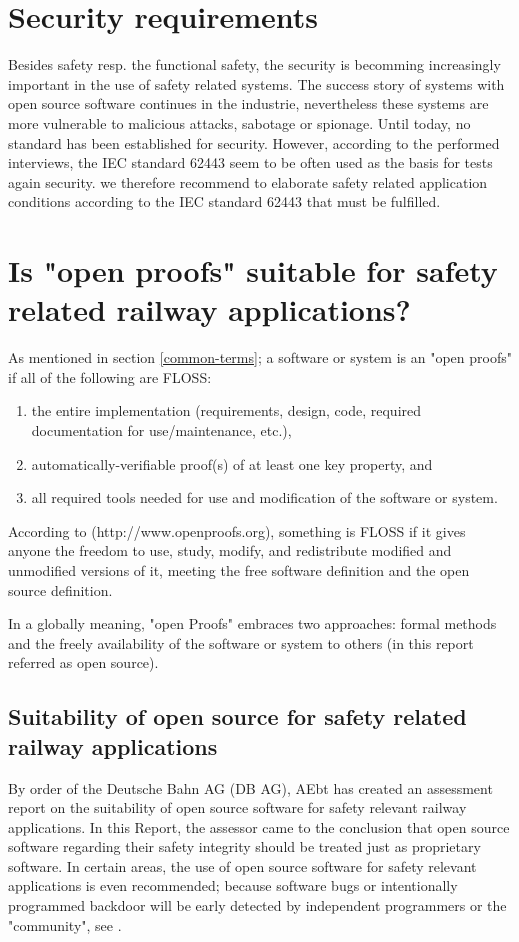 \documentclass{template/openetcs_report}
\begin{document}
\section{Security requirements}
Besides safety resp. the functional safety, the security is becomming increasingly important in the use of safety related systems.
The success story of systems with open source software continues in the industrie, nevertheless these systems are more vulnerable to malicious attacks, sabotage or spionage. 
Until today, no standard has been established for security. However, according to the performed interviews, the IEC standard 62443 seem to be often used as the basis for tests again security.
we therefore recommend to elaborate safety related application conditions according to the IEC standard 62443 that must be fulfilled.


\section{Is "open proofs" suitable for safety related railway applications?}
As mentioned in section \ref{common-terms}; a software or system is an "open proofs" if all of the following are FLOSS: 
\begin{enumerate}
\itemsep=0pt
  \item the entire implementation (requirements, design, code, required documentation for use/maintenance, etc.),
  \item automatically-verifiable proof(s) of at least one key property, and
  \item all required tools needed for use and modification of the software or system.
\end{enumerate}

According to (http://www.openproofs.org), something is FLOSS if it gives anyone the freedom to use, study, modify, and redistribute modified and unmodified versions of it, meeting the free software definition and the open source definition.

In a globally meaning, "open Proofs" embraces two approaches: formal methods and the freely availability of the software or system to others (in this report referred as open source).


\subsection{Suitability of open source for safety related railway applications}
By order of the Deutsche Bahn AG (DB AG), AEbt has created an assessment report on the suitability of open source software for safety relevant railway applications.
In this Report, the assessor came to the conclusion that open source software regarding their safety integrity should be treated just as proprietary software. In certain areas, the use of open source software for safety relevant applications is even recommended; because software bugs or intentionally programmed backdoor will be early detected by independent programmers or the "community", see \cite{AEbt-doc}.
\end{document}
